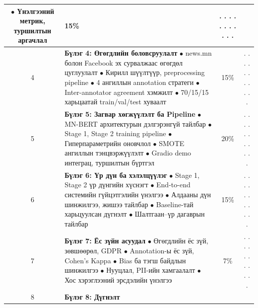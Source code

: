 \begin{titlepage}
\begin{center}
\begin{tabular}{|c|p{9.5cm}|c|c|}
\newline $\bullet$ Үнэлгээний метрик, туршилтын аргачлал & 15\% & . . . . . . . . . . . \\ \hline
4 & \textbf{Бүлэг 4: Өгөгдлийн боловсруулалт}
\newline $\bullet$ news.mn болон Facebook эх сурвалжаас өгөгдөл цуглуулалт
\newline $\bullet$ Кирилл шүүлтүүр, preprocessing pipeline
\newline $\bullet$ 4 ангиллын annotation стратеги
\newline $\bullet$ Inter-annotator agreement хэмжилт
\newline $\bullet$ 70/15/15 харьцаатай train/val/test хуваалт & 15\% & . . . . . . . . . . . \\ \hline
5 & \textbf{Бүлэг 5: Загвар хөгжүүлэлт ба Pipeline}
\newline $\bullet$ MN-BERT архитектурын дэлгэрэнгүй тайлбар
\newline $\bullet$ Stage 1, Stage 2 training pipeline
\newline $\bullet$ Гиперпараметрийн оновчлол
\newline $\bullet$ SMOTE ангиллын тэнцвэржүүлэлт
\newline $\bullet$ Gradio demo интеграц, туршилтын бүртгэл & 20\% & . . . . . . . . . . . \\ \hline
6 & \textbf{Бүлэг 6: Үр дүн ба хэлэлцүүлэг}
\newline $\bullet$ Stage 1, Stage 2 үр дүнгийн хүснэгт
\newline $\bullet$ End-to-end системийн гүйцэтгэлийн үнэлгээ
\newline $\bullet$ Алдааны дүн шинжилгээ, жишээ тайлбар
\newline $\bullet$ Baseline-тай харьцуулсан дүгнэлт
\newline $\bullet$ Шалтгаан--үр дагаврын тайлбар & 15\% & . . . . . . . . . . . \\ \hline
7 & \textbf{Бүлэг 7: Ёс зүйн асуудал}
\newline $\bullet$ Өгөгдлийн ёс зүй, зөвшөөрөл, GDPR
\newline $\bullet$ Annotation-ы ёс зүй, Cohen's Kappa
\newline $\bullet$ Bias ба тэгш байдлын шинжилгээ
\newline $\bullet$ Нууцлал, PII-ийн хамгаалалт
\newline $\bullet$ Хос хэрэглээний эрсдэлийн үнэлгээ & 7\% & . . . . . . . . . . . \\ \hline
8 & \textbf{Бүлэг 8: Дүгнэлт}

\end{tabular}
\end{center}
\end{titlepage}
